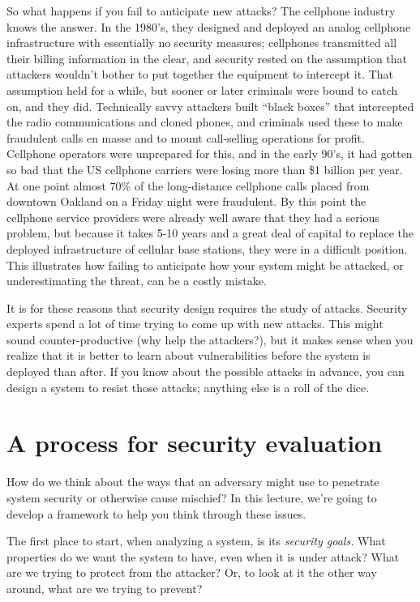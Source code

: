 \documentclass[11pt]{article}
\begin{document}
So what happens if you fail to anticipate new attacks?
The cellphone industry knows the answer. In the 1980's, they designed
and deployed an analog cellphone infrastructure with essentially no
security measures; cellphones transmitted all their billing
information in the clear, and security rested on the assumption that
attackers wouldn't bother to put together the equipment to intercept
it. That assumption held for a while, but sooner or later criminals
were bound to catch on, and they did. Technically savvy attackers
built ``black boxes'' that intercepted the radio communications and
cloned phones, and criminals used these to make fraudulent calls 
en masse and to mount call-selling operations for profit. Cellphone
operators were unprepared for this, and in the early 90's, it had
gotten so bad that the US cellphone carriers were losing more than \$1
billion per year. At one point almost 70\% of the
long-distance cellphone calls placed from downtown Oakland on a Friday
night were fraudulent. By this point the cellphone service providers
were already well aware that they had a serious problem, but because
it takes 5-10 years and a great deal of capital to replace the
deployed infrastructure of cellular base stations, they were in a
difficult position. This illustrates how failing to anticipate how your
system might be attacked, or underestimating the threat, can be a costly
mistake.

It is for these reasons that security design requires the
study of attacks. Security experts spend a lot of time trying to come
up with new attacks. This might sound counter-productive (why help the
attackers?), but it makes sense when you realize that it is better to
learn about vulnerabilities before the system is deployed than
after. If you know about the possible attacks in advance, you can
design a system to resist those attacks; anything else is a roll of
the dice. 

\section{A process for security evaluation}

How do we think
about the ways that an adversary might use to penetrate system
security or otherwise cause mischief? In this lecture, we're going to
develop a framework to help you think through these issues. 

The first
place to start, when analyzing a system, is its {\em security goals.} What
properties do we want the system to have, even when it is under
attack? What are we trying to protect from the attacker? Or, to look
at it the other way around, what are we trying to prevent?
\end{document}
